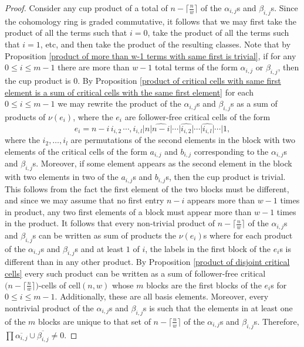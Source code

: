 \documentclass[pagebackref,colorlinks,citecolor=blue,linkcolor=blue,urlcolor=blue,filecolor=blue]{article}
\theoremstyle{definition}\newtheorem{definition}[thm]{Definition}
\theoremstyle{definition}
\begin{document}
\begin{proof}
Consider any cup product of a total of $n-\big\lceil\frac{n}{w}\big\rceil$ of the $\alpha_{i,j}$s and $\beta_{i,j}$s.
Since the cohomology ring is graded commutative, it follows that we may first take the product of all the terms such that $i=0$, take the product of all the terms such that $i=1$, etc, and then take the product of the resulting classes.
Note that by Proposition \ref{product of more than w-1 terms with same first is trivial}, if for any $0\le i\le m-1$ there are more than $w-1$ total terms of the form $\alpha_{i,j}$ or $\beta_{i,j}$, then the cup product is $0$. 
By Proposition \ref{product of critical cells with same first element is a sum of critical cells with the same first element} for each  $0\le i\le m-1$ we may rewrite the product of the $\alpha_{i, j}$s and $\beta_{i,j}$s as a sum of products of $\nu(e_{i})$, where the $e_{i}$ are follower-free critical cells of the form
\[
e_{i}=n-i\, i_{i,2}\, \cdots, i_{i,l}|n|\widehat{n-i}|\cdots|\widehat{i_{i,2}}|\cdots|\widehat{i_{i,l}}|\cdots|1,
\]
where the $i_{2},\dots, i_{l}$ are permutations of the second elements in the block with two elements of the critical cells of the form $a_{i,j}$ and $b_{i,j}$ corresponding to the $\alpha_{i, j}$s and $\beta_{i,j}$s.
Moreover, if some element appears as the second element in the block with two elements in two of the $a_{i,j}$s and $b_{i,j}$s, then the cup product is trivial.
This follows from the fact the first element of the two blocks must be different, and since we may assume that no first entry $n-i$ appears more than $w-1$ times in product, any two first elements of a block must appear more than $w-1$ times in the product.
It follows that every non-trivial product of $n-\big\lceil\frac{n}{w}\big\rceil$ of the $\alpha_{i,j}$s and $\beta_{i,j}$s can be written as sum of products the $\nu(e_{i})$s where for each product of the $\alpha_{i,j}$s and $\beta_{i,j}$s and at least $1$ of $i$, the labels in the first block of the $e_{i}$s is different than in any other product.
By Proposition \ref{product of disjoint critical cells} every such product can be written as a sum of follower-free critical $\big(n-\big\lceil\frac{n}{w}\big\rceil\big)$-cells of $\text{cell}(n,w)$ whose $m$ blocks are the first blocks of the $e_{i}$s for $0\le i\le m-1$.
Additionally, these are all basis elements.
Moreover, every nontrivial product of the $\alpha_{i, j}$s and $\beta_{i,j}$s is such that the elements in at least one of the $m$ blocks are unique to that set of $n-\big\lceil\frac{n}{w}\big\rceil$ of the $\alpha_{i,j}$s and $\beta_{i,j}$s.
Therefore, $\prod\overline{\alpha_{i,j}}\cup\overline{\beta_{i,j}}\neq 0$.
\end{proof}
\end{document}
